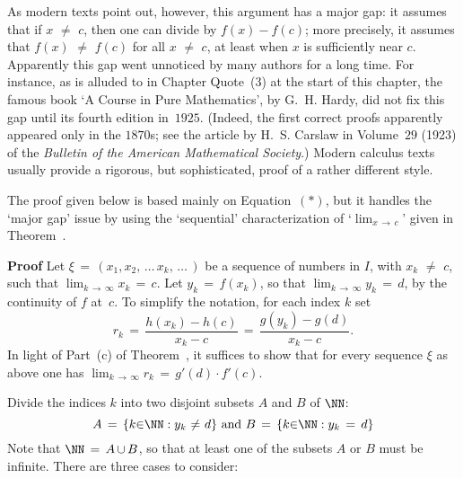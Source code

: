        As modern texts point out, however, this argument has a major gap: it assumes that if $x \,\,{\neq}\,\, c$, then one can divide by $f(x)-f(c)$;
    more precisely, it assumes that $f(x) \,\,{\neq}\,\, f(c)$ for all $x \,\,{\neq}\,\, c$, at least when $x$ is sufficiently near $c$.
    Apparently this gap went unnoticed by many authors for a long time. For instance, as is alluded to in Chapter Quote~(3) at the start of this chapter, 
    the famous book `A Course in Pure Mathematics', by G.~H. Hardy, did not fix this gap until its fourth edition in~$1925$.
    (Indeed, the first correct proofs apparently appeared only in the $1870$s; see the article by H.~S. Carslaw in Volume~$29$ (1923) of the {\em Bulletin of the American Mathematical Society}.)
    Modern calculus texts usually provide a rigorous, but sophisticated, proof of a rather different style.

        The proof given below is based mainly on Equation~$({\ast})$, but it handles the `major gap' issue by using the `sequential' characterization of 
    `${\displaystyle \lim_{x \,{\rightarrow}\, c}}$' given in Theorem~.

\V

         {\bf Proof} Let ${\xi} \,=\, (x_{1},x_{2},\,{\ldots}\,x_{k},\,{\ldots}\,)$
    be a sequence of numbers in $I$, with $x_{k} \,\,{\neq}\,\, c$, such that ${\displaystyle \lim_{k \,{\rightarrow}\, {\infty}} x_{k} \,=\, c}$.
    Let $y_{k} \,=\, f(x_{k})$, so that $\lim_{k \,{\rightarrow}\, {\infty}} y_{k} \,=\, d$, by the continuity of $f$ at~$c$.
    To simplify the notation, for each index $k$ set
        \begin{displaymath}
        r_{k} \,=\, \frac{h(x_{k})-h(c)}{x_{k}-c} \,=\, \frac{g(y_{k})-g(d)}{x_{k}-c}.
        \end{displaymath}
    In light of Part~(c) of Theorem~, it suffices to show that for every sequence ${\xi}$ as above one has
    $\lim_{k \,{\rightarrow}\, {\infty}} r_{k} \,=\, g'(d){\cdot}f'(c)$.


        Divide the indices $k$ into two disjoint subsets $A$ and $B$ of ${\NN}$:
        \begin{displaymath}
        A \,=\, \{k{\in}{\NN}: y_{k} \,\,{\neq}\,\, d\} \mbox{ and }
        B \,=\, \{k{\in}{\NN}: y_{k} \,=\, d\}
        \end{displaymath}
    Note that ${\NN} \,=\, A\,{\cup}\,B$, so that at least one of the subsets $A$ or $B$ must be infinite. There are three cases to consider:

